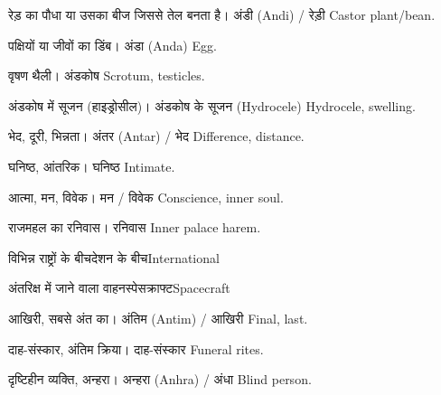 %
{रेड़ का पौधा या उसका बीज जिससे तेल बनता है।}%
{अंडी (Andi) / रेड़ी}%
{Castor plant/bean.}

%
{पक्षियों या जीवों का डिंब।}%
{अंडा (Anda)}%
{Egg.}

%
{वृषण थैली।}%
{अंडकोष}%
{Scrotum, testicles.}

%
{अंडकोष में सूजन (हाइड्रोसील)।}%
{अंडकोष के सूजन (Hydrocele)}%
{Hydrocele, swelling.}

%
{भेद, दूरी, भिन्नता।}%
{अंतर (Antar) / भेद}%
{Difference, distance.}

%
{घनिष्ठ, आंतरिक।}%
{घनिष्ठ}%
{Intimate.}

%
{आत्मा, मन, विवेक।}%
{मन / विवेक}%
{Conscience, inner soul.}

%
{राजमहल का रनिवास।}%
{रनिवास}%
{Inner palace harem.}

%
{विभिन्न राष्ट्रों के बीच}{देशन के बीच}{International}

%
{अंतरिक्ष में जाने वाला वाहन}{स्पेसक्राफ्ट}{Spacecraft}

%
{आखिरी, सबसे अंत का।}%
{अंतिम (Antim) / आखिरी}%
{Final, last.}

%
{दाह-संस्कार, अंतिम क्रिया।}%
{दाह-संस्कार}%
{Funeral rites.}

%
{दृष्टिहीन व्यक्ति, अन्हरा।}%
{अन्हरा (Anhra) / अंधा}%
{Blind person.}

